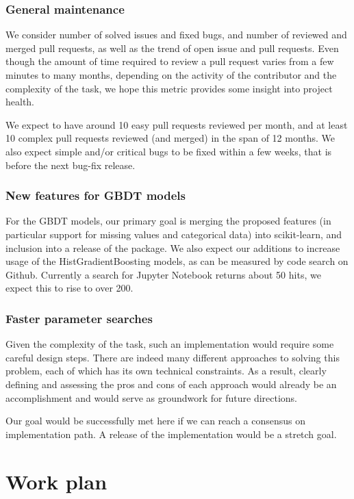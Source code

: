 \documentclass[11pt]{article}  %
\begin{document}
\subsubsection{General maintenance}

We consider number of solved issues and fixed bugs, and number of reviewed and  merged pull requests, as well as the trend of open issue and pull requests. Even though the amount of time required to review a pull
request varies from a few minutes to many months, depending on the activity
of the contributor and the complexity of the task, we hope this metric provides some insight into project health.

We expect to have around 10 easy pull requests reviewed per month, and at least 10 complex pull requests reviewed (and merged) in the span of 12 months. We also expect simple and/or critical bugs to be fixed within a few weeks, that is before the next bug-fix release.

\subsubsection{New features for GBDT models}

For the GBDT models, our primary goal is merging the proposed
features (in particular support for missing values and categorical data) into scikit-learn, and inclusion into a release of the package. We also expect our additions to increase usage of the HistGradientBoosting models, as can be measured by code search on Github. Currently a search for Jupyter Notebook returns about 50 hits, we expect this to rise to over 200.

\subsubsection{Faster parameter searches}

Given the complexity of the
task, such an implementation would require some careful design steps. There
are indeed many different approaches to solving this problem, each of which
has its own technical constraints. As a result, clearly defining and
assessing the pros and cons of each approach would already be an
accomplishment and would serve as groundwork for future directions.

Our goal would be successfully met here if we can reach a consensus on implementation path. A release of the implementation would be a stretch goal.


\section{Work plan}
\end{document}
